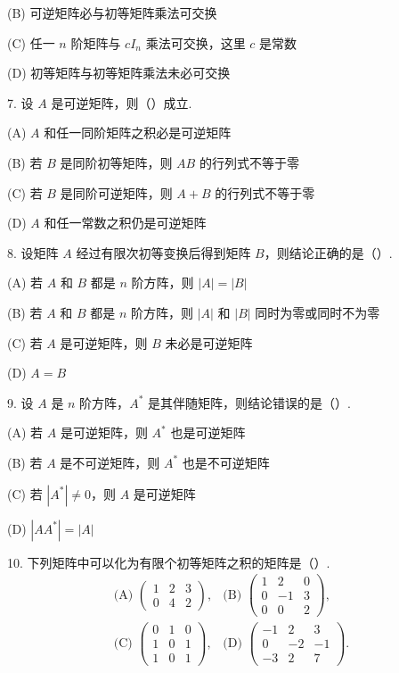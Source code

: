 \documentclass[UTF8,12pt,a4paper,fontset=fandol]{ctexart}
\begin{document}
(B) 可逆矩阵必与初等矩阵乘法可交换

(C) 任一 $n$ 阶矩阵与 $cI_n$ 乘法可交换，这里 $c$ 是常数

(D) 初等矩阵与初等矩阵乘法未必可交换

7. 设 $A$ 是可逆矩阵，则（\quad ）成立.

(A) $A$ 和任一同阶矩阵之积必是可逆矩阵

(B) 若 $B$ 是同阶初等矩阵，则 $AB$ 的行列式不等于零

(C) 若 $B$ 是同阶可逆矩阵，则 $A+B$ 的行列式不等于零

(D) $A$ 和任一常数之积仍是可逆矩阵

8. 设矩阵 $A$ 经过有限次初等变换后得到矩阵 $B$，则结论正确的是（\quad ）.

(A) 若 $A$ 和 $B$ 都是 $n$ 阶方阵，则 $|A|=|B|$

(B) 若 $A$ 和 $B$ 都是 $n$ 阶方阵，则 $|A|$ 和 $|B|$ 同时为零或同时不为零

(C) 若 $A$ 是可逆矩阵，则 $B$ 未必是可逆矩阵

(D) $A=B$

9. 设 $A$ 是 $n$ 阶方阵，$A^*$ 是其伴随矩阵，则结论错误的是（\quad ）.

(A) 若 $A$ 是可逆矩阵，则 $A^*$ 也是可逆矩阵

(B) 若 $A$ 是不可逆矩阵，则 $A^*$ 也是不可逆矩阵

(C) 若 $|A^*|\ne0$，则 $A$ 是可逆矩阵

(D) $|AA^*|=|A|$

10. 下列矩阵中可以化为有限个初等矩阵之积的矩阵是（\quad ）.
\[
\begin{array}{ll}
\text{(A) }\left(\begin{array}{ccc}1&2&3\\0&4&2\end{array}\right),&
\text{(B) }\left(\begin{array}{ccc}1&2&0\\0&-1&3\\0&0&2\end{array}\right),\\[1em]
\text{(C) }\left(\begin{array}{ccc}0&1&0\\1&0&1\\1&0&1\end{array}\right),&
\text{(D) }\left(\begin{array}{rrr}-1&2&3\\0&-2&-1\\-3&2&7\end{array}\right).
\end{array}
\]
\end{document}
